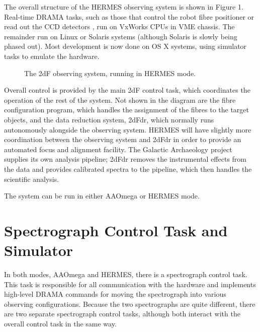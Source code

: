The overall structure of the HERMES observing system is shown in Figure 1. Real-time DRAMA tasks, such as those that control the robot fibre positioner or read out the CCD detectors \citep{AAO2_2004},  run on VxWorks CPUs in VME chassis. The remainder run on Linux or Solaris systems (although Solaris is slowly being phased out). Most development is now done on OS X systems, using simulator tasks to emulate the hardware.

\begin{figure}
\caption{The 2dF observing system, running in HERMES mode.}
\end{figure}

Overall control is provided by the main 2dF control task, which coordinates the operation of the rest of the system. Not shown in the diagram are the fibre configuration program, which handles the assignment of the fibres to the target objects, and the data reduction system, 2dFdr, which normally runs autonomously alongside the observing system. HERMES will have slightly more coordination between the observing system and 2dFdr in order to provide an automated focus and alignment facility. The Galactic Archaeology project supplies its own analysis pipeline; 2dFdr removes the instrumental effects from the data and provides calibrated spectra to the pipeline, which then handles the scientific analysis.

The system can be run in either AAOmega or HERMES mode.

\section{Spectrograph Control Task and Simulator}

In both modes, AAOmega and HERMES, there is a spectrograph control task. This task is responsible for all communication with the hardware and implements high-level DRAMA commands for moving the spectrograph into various observing configurations. Because the two spectrographs are quite different, there are two separate spectrograph control tasks, although both interact with the overall control task in the same way.

